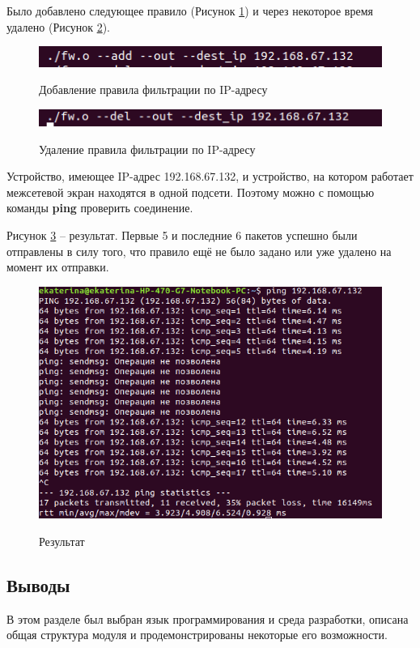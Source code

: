 Было добавлено следующее правило (Рисунок \ref{fig19:image}) и через некоторое время удалено (Рисунок \ref{fig20:image}). 

\begin{figure}[h]
	\begin{center}
		{\includegraphics[scale = 0.6]{img/screenshots/ip/add_rule.png}}
		\caption{Добавление правила фильтрации по IP-адресу}
		\label{fig19:image}
	\end{center}
\end{figure}

\begin{figure}[h]
	\begin{center}
		{\includegraphics[scale = 0.6]{img/screenshots/ip/del_rule.png}}
		\caption{Удаление правила фильтрации по IP-адресу}
		\label{fig20:image}
	\end{center}
\end{figure}

\newpage

Устройство, имеющее IP-адрес 192.168.67.132, и устройство, на котором работает межсетевой экран находятся в одной подсети. Поэтому можно с помощью команды \textbf{ping} проверить соединение.

Рисунок \ref{fig21:image} -- результат. Первые 5 и последние 6 пакетов успешно были отправлены в силу того, что правило ещё не было задано или уже удалено на момент их отправки.
\begin{figure}[h]
	\begin{center}
		{\includegraphics[scale = 0.5]{img/screenshots/ip/result.png}}
		\caption{Результат}
		\label{fig21:image}
	\end{center}
\end{figure}

\subsection{Выводы}
В этом разделе был выбран язык программирования и среда разработки, описана общая структура модуля и продемонстрированы некоторые его возможности.
